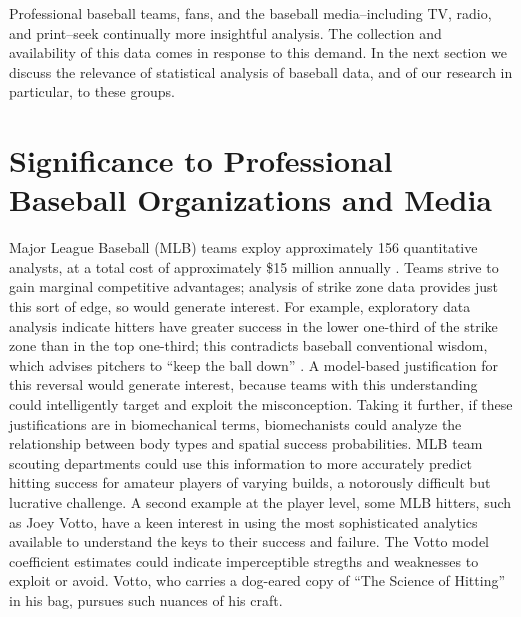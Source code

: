 
Professional baseball teams, fans, and the baseball media--including TV, radio, and print--seek continually more insightful analysis. The collection and availability of this data comes in response to this demand. In the next section we discuss the relevance of statistical analysis of baseball data, and of our research in particular, to these groups.

\section{Significance to Professional Baseball Organizations and Media}

Major League Baseball (MLB\textsuperscript{\textregistered}) teams exploy approximately 156 quantitative analysts, at a total cost of approximately \$15 million annually \citep{Lindbergh2016}. Teams strive to gain marginal competitive advantages; analysis of strike zone data provides just this sort of edge, so would generate interest. For example, exploratory data analysis indicate hitters have greater success in the lower one-third of the strike zone than in the top one-third; this contradicts baseball conventional wisdom, which advises pitchers to ``keep the ball down'' \citep{Stallings2003}. A model-based justification for this reversal would generate interest, because teams with this understanding could intelligently target and exploit the misconception. Taking it further, if these justifications are in biomechanical terms, biomechanists could analyze the relationship between body types and spatial success probabilities. MLB\textsuperscript{\textregistered} team scouting departments could use this information to more accurately predict hitting success for amateur players of varying builds, a notorously difficult but lucrative challenge. A second example at the player level, some MLB\textsuperscript{\textregistered} hitters, such as Joey Votto, have a keen interest in using the most sophisticated analytics available to understand the keys to their success and failure\citep{Daugherty2015}. The Votto model coefficient estimates could indicate imperceptible stregths and weaknesses to exploit or avoid. Votto, who carries a dog-eared copy of ``The Science of Hitting'' in his bag, pursues such nuances of his craft. 

